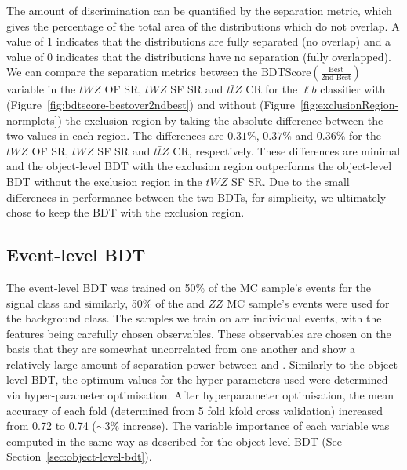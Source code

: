 The amount of discrimination can be quantified by the separation metric, which gives the percentage of the total area of the distributions which do not overlap. A value of 1 indicates that the distributions are fully separated (no overlap) and a value of 0 indicates that the distributions have no separation (fully overlapped). We can compare the separation metrics between the BDTScore$(\frac{\text{Best}}{\text{2nd Best}})$ variable in the $tWZ$ OF SR, $tWZ$ SF SR and $t\bar{t}Z$ CR for the $\ell b$ classifier with (Figure~\ref{fig:bdtscore-bestover2ndbest}) and without (Figure~\ref{fig:exclusionRegion-normplots}) the exclusion region by taking the absolute difference between the two values in each region. The differences are $0.31\%$, $0.37\%$ and $0.36\%$ for the $tWZ$ OF SR, $tWZ$ SF SR and $t\bar{t}Z$ CR, respectively. These differences are minimal and the object-level BDT with the exclusion region outperforms the object-level BDT without the exclusion region in the $tWZ$ SF SR. Due to the small differences in performance between the two BDTs, for simplicity, we ultimately chose to keep the BDT with the exclusion region.



\subsection{Event-level BDT}
\label{sec:event-level-bdt}
The event-level BDT was trained on 50$\%$ of the \tWZ MC sample's events for the signal class and similarly, 50$\%$ of the \ttZ and $ZZ$ MC sample's events were used for the background class. The samples we train on are individual events, with the features being carefully chosen observables. These observables are chosen on the basis that they are somewhat uncorrelated from one another and show a relatively large amount of separation power between \tWZ and \ttZ. Similarly to the object-level BDT, the optimum values for the hyper-parameters used were determined via hyper-parameter optimisation.  After hyperparameter optimisation, the mean accuracy of each fold (determined from 5 fold kfold cross validation) increased from 0.72 to 0.74 ($\sim 3\%$ increase). The variable importance of each variable was computed in the same way as described for the object-level BDT (See Section~\ref{sec:object-level-bdt}).

